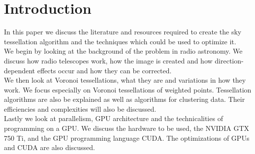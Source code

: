\section{Introduction}\label{int}
In this paper we discuss the literature and resources required to create the sky tessellation algorithm and the techniques which could be used to optimize it.
\\
We begin by looking at the background of the problem in radio astronomy. We discuss how radio telescopes work, how the image is created and how direction-dependent effects occur and how they can be corrected.
\\
We then look at Voronoi tessellations, what they are and variations in how they work. We focus especially on Voronoi tessellations of weighted points. Tessellation algorithms are also be explained as well as algorithms for clustering data. Their efficiencies and complexities will also be discussed.
\\
Lastly we look at parallelism, GPU architecture and the technicalities of programming on a GPU. We discuss the hardware to be used, the NVIDIA GTX 750 Ti, and the GPU programming language CUDA. The optimizations of GPUs and CUDA are also discussed.
